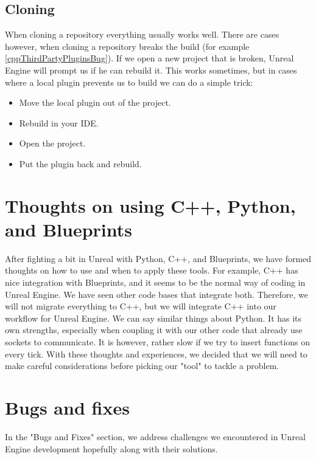 \documentclass{uva-inf-article}
\begin{document}
\subsection{Cloning}\label{cloning}
When cloning a repository everything usually works well. There are cases however, when cloning a repository breaks the build (for example \ref{cppThirdPartyPluginsBug}).
If we open a new project that is broken, Unreal Engine will prompt us if he can rebuild it. This works sometimes, but in cases where a local plugin prevents us to build we can do a simple trick:
\begin{itemize}
    \item Move the local plugin out of the project.
    \item Rebuild in your IDE.
    \item Open the project.
    \item Put the plugin back and rebuild.
\end{itemize}

\section{Thoughts on using C++, Python, and Blueprints}
After fighting a bit in Unreal with Python, C++, and Blueprints, we have formed thoughts on how to use and when to apply these tools. For example, C++ has nice integration with Blueprints, and it seems to be the normal way of coding in Unreal Engine. We have seen other code bases that integrate both. Therefore, we will not migrate everything to C++, but we will integrate C++ into our workflow for Unreal Engine. We can say similar things about Python. It has its own strengths, especially when coupling it with our other code that already use sockets to communicate. It is however, rather slow if we try to insert functions on every tick. With these thoughts and experiences, we decided that we will need to make careful considerations before picking our "tool" to tackle a problem.

\section{Bugs and fixes}
In the "Bugs and Fixes" section, we address challenges we encountered in Unreal Engine development hopefully along with their solutions.
\end{document}
